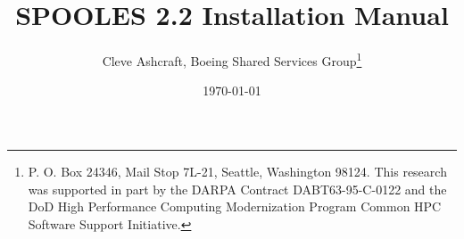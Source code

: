 \documentclass[leqno,10pt,twoside]{article}
\begin{document}


\title{ {\bf SPOOLES 2.2} Installation Manual }

\author{Cleve Ashcraft,
        Boeing Shared Services Group\thanks{
      P. O. Box 24346,
      Mail Stop 7L-21,
      Seattle, Washington 98124.
      This research was supported in part by the DARPA
      Contract DABT63-95-C-0122 and the DoD High Performance Computing
      Modernization Program Common HPC Software Support Initiative.}
}

\date{\today}
\maketitle









\end{document}
